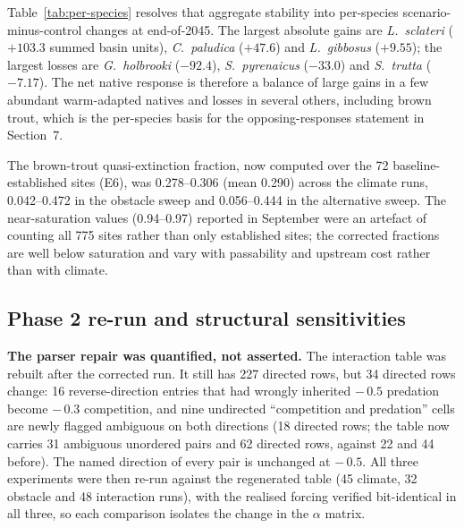 \documentclass[11pt,a4paper]{article}
\begin{document}
Table~\ref{tab:per-species} resolves that aggregate stability into per-species scenario-minus-control changes at end-of-2045. The largest absolute gains are \textit{L.~sclateri} ($+103.3$ summed basin units), \textit{C.~paludica} ($+47.6$) and \textit{L.~gibbosus} ($+9.55$); the largest losses are \textit{G.~holbrooki} ($-92.4$), \textit{S.~pyrenaicus} ($-33.0$) and \textit{S.~trutta} ($-7.17$). The net native response is therefore a balance of large gains in a few abundant warm-adapted natives and losses in several others, including brown trout, which is the per-species basis for the opposing-responses statement in Section~7.

The brown-trout quasi-extinction fraction, now computed over the 72 baseline-established sites (E6), was 0.278--0.306 (mean 0.290) across the climate runs, 0.042--0.472 in the obstacle sweep and 0.056--0.444 in the alternative sweep. The near-saturation values (0.94--0.97) reported in September were an artefact of counting all 775 sites rather than only established sites; the corrected fractions are well below saturation and vary with passability and upstream cost rather than with climate.

\subsection{Phase 2 re-run and structural sensitivities}
\label{sec:phase2}

\textbf{The parser repair was quantified, not asserted.} The interaction table was rebuilt after the corrected run. It still has 227 directed rows, but 34 directed rows change: 16 reverse-direction entries that had wrongly inherited $-\,0.5$ predation become $-\,0.3$ competition, and nine undirected ``competition and predation'' cells are newly flagged ambiguous on both directions (18 directed rows; the table now carries 31 ambiguous unordered pairs and 62 directed rows, against 22 and 44 before). The named direction of every pair is unchanged at $-\,0.5$. All three experiments were then re-run against the regenerated table (45 climate, 32 obstacle and 48 interaction runs), with the realised forcing verified bit-identical in all three, so each comparison isolates the change in the $\alpha$ matrix.
\end{document}
